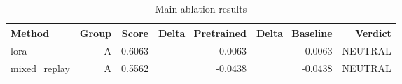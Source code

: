 \begin{table}[htbp]
\centering
\caption{Main ablation results}
\label{tab:main-results}
\begin{tabular}{lrrrrr}
\toprule
\textbf{Method} & \textbf{Group} & \textbf{Score} & \textbf{Delta\_Pretrained} & \textbf{Delta\_Baseline} & \textbf{Verdict} \\
\midrule
lora & A & 0.6063 & 0.0063 & 0.0063 & NEUTRAL \\
mixed\_replay & A & 0.5562 & -0.0438 & -0.0438 & NEUTRAL \\
\bottomrule
\end{tabular}
\end{table}